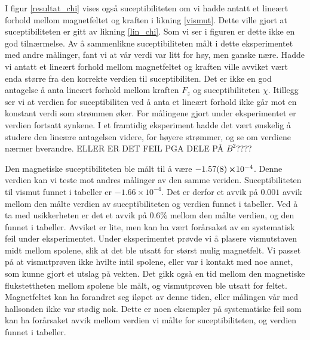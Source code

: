 \documentclass[%
 reprint,
 amsmath,amssymb,
 aps,
]{revtex4-1}
\begin{document}
I figur \vref{resultat_chi} vises også suceptibiliteten om vi hadde antatt et lineært forhold mellom magnetfeltet og kraften i likning \eqref{vismut}. Dette ville gjort at suceptibiliteten er gitt av likning \eqref{lin_chi}. Som vi ser i figuren er dette ikke en god tilnærmelse. Av å sammenlikne suceptibiliteten målt i dette eksperimentet med andre målinger, fant vi at vår verdi var litt for høy, men ganske nære. Hadde vi antatt et lineært forhold mellom magnetfeltet og kraften ville avviket vært enda større fra den korrekte verdien til suceptibiliten. Det er ikke en god antagelse å anta lineært forhold mellom kraften $F_z$ og suceptibiliteten $\chi$. Itillegg ser vi at verdien for suceptibiliten ved å anta et lineært forhold ikke går mot en konstant verdi som strømmen øker. For målingene gjort under eksperimentet er verdien fortsatt synkene. I et framtidig eksperiment hadde det vært ønskelig å studere den lineære antagelsen videre, for høyere strømmer, og se om verdiene nærmer hverandre. ELLER ER DET FEIL PGA DELE PÅ $B^2$????\par
Den magnetiske suceptibiliteten ble målt til å være $-\SI{1.57\pm0.08}\cross 10^{-4}$. Denne verdien kan vi teste mot andres målinger av den samme veriden. Suceptibiliteten til vismut funnet i tabeller \cite{noauthor_magnetic_2018} \cite{noauthor_magnetic_nodate} er $-1.66×10^{−4}$. Det er derfor et avvik på $0.001$ avvik mellom den målte verdien av suceptibiliteten og verdien funnet i tabeller. Ved å ta med usikkerheten er det et avvik på $0.6\%$ mellom den målte verdien, og den funnet i tabeller. Avviket er lite, men kan ha vært forårsaket av en systematisk feil under eksperimentet. Under eksperimentet prøvde vi å plasere vismutstaven midt mellom spolene, slik at det ble utsatt for størst mulig magnetfelt. Vi passet på at vismutprøven ikke hvilte intil spolene, eller var i kontakt med noe annet, som kunne gjort et utslag på vekten. Det gikk også en tid mellom den magnetiske flukstettheten mellom spolene ble målt, og vismutprøven ble utsatt for feltet. Magnetfeltet kan ha forandret seg iløpet av denne tiden, eller målingen vår med hallsonden ikke var stødig nok. Dette er noen eksempler på systematiske feil som kan ha forårsaket avvik mellom verdien vi målte for suceptibiliteten, og verdien funnet i tabeller.
\end{document}
